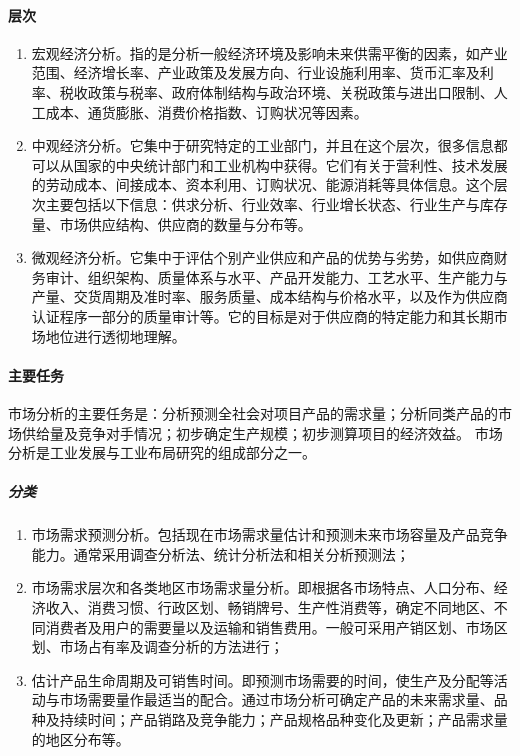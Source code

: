\documentclass[letterpaper,10pt,english]{sphinxmanual}
\begin{document}
\paragraph{层次}
\label{\detokenize{chapter_knowledge/market_analysis:id2}}\begin{enumerate}
%
\item {} 
宏观经济分析。指的是分析一般经济环境及影响未来供需平衡的因素，如产业范围、经济增长率、产业政策及发展方向、行业设施利用率、货币汇率及利率、税收政策与税率、政府体制结构与政治环境、关税政策与进出口限制、人工成本、通货膨胀、消费价格指数、订购状况等因素。

\item {} 
中观经济分析。它集中于研究特定的工业部门，并且在这个层次，很多信息都可以从国家的中央统计部门和工业机构中获得。它们有关于营利性、技术发展的劳动成本、间接成本、资本利用、订购状况、能源消耗等具体信息。这个层次主要包括以下信息：供求分析、行业效率、行业增长状态、行业生产与库存量、市场供应结构、供应商的数量与分布等。

\item {} 
微观经济分析。它集中于评估个别产业供应和产品的优势与劣势，如供应商财务审计、组织架构、质量体系与水平、产品开发能力、工艺水平、生产能力与产量、交货周期及准时率、服务质量、成本结构与价格水平，以及作为供应商认证程序一部分的质量审计等。它的目标是对于供应商的特定能力和其长期市场地位进行透彻地理解。

\end{enumerate}


\paragraph{主要任务}
\label{\detokenize{chapter_knowledge/market_analysis:id3}}
市场分析的主要任务是：分析预测全社会对项目产品的需求量；分析同类产品的市场供给量及竞争对手情况；初步确定生产规模；初步测算项目的经济效益。
市场分析是工业发展与工业布局研究的组成部分之一。


\subparagraph{分类}
\label{\detokenize{chapter_knowledge/market_analysis:id4}}\begin{enumerate}
%
\item {} 
市场需求预测分析。包括现在市场需求量估计和预测未来市场容量及产品竞争能力。通常采用调查分析法、统计分析法和相关分析预测法；

\item {} 
市场需求层次和各类地区市场需求量分析。即根据各市场特点、人口分布、经济收入、消费习惯、行政区划、畅销牌号、生产性消费等，确定不同地区、不同消费者及用户的需要量以及运输和销售费用。一般可采用产销区划、市场区划、市场占有率及调查分析的方法进行；

\item {} 
估计产品生命周期及可销售时间。即预测市场需要的时间，使生产及分配等活动与市场需要量作最适当的配合。通过市场分析可确定产品的未来需求量、品种及持续时间；产品销路及竞争能力；产品规格品种变化及更新；产品需求量的地区分布等。

\end{enumerate}
\end{document}
